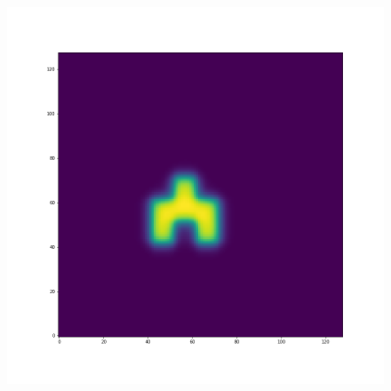 \documentclass[12pt,a4paper]{article}
\begin{document}
\begin{figure}[H]
\begin{minipage}{.3\textwidth}
\end{minipage}%
\begin{minipage}{.3\textwidth}
  \centering
  \includegraphics[width=\linewidth]{Pictures/Solve2DWhiteBearMovementTestMUSCL/Solve2DWhiteBearMovementTest_t20.png}
\end{minipage}
\end{figure}
\end{document}
